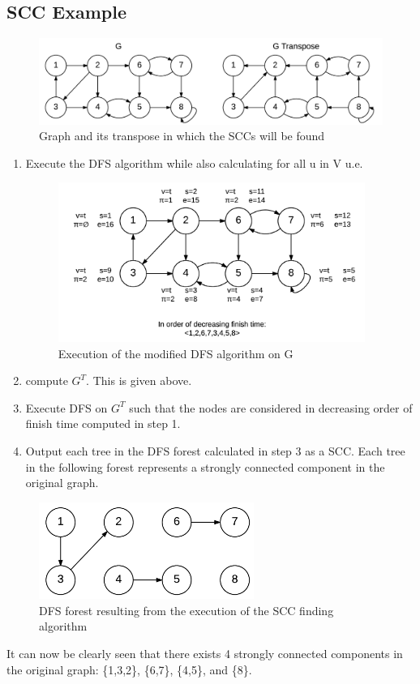 \documentclass[12pt,letterpaper]{article}
\begin{document}
\subsection{SCC Example}
\begin{figure}[h]
\centering
\includegraphics[width=13cm]{scccomplete}
\caption{Graph and its transpose in which the SCCs will be found}
\end{figure}
\begin{enumerate}
\item Execute the DFS algorithm while also calculating for all u in V u.e.
\begin{figure}[h]
\centering
\includegraphics[width=10cm]{scccomplete1}
\caption{Execution of the modified DFS algorithm on G}
\end{figure}
\FloatBarrier
\item compute $G^T$. This is given above.
\item Execute DFS on $G^T$ such that the nodes are considered in decreasing order of finish time computed in step 1.
\item Output each tree in the DFS forest calculated in step 3 as a SCC. Each tree in the following forest represents a strongly connected component in the original graph.
\end{enumerate}
\begin{figure}[h]
\centering
\includegraphics[width=7cm]{scccomplete2}
\caption{DFS forest resulting from the execution of the SCC finding algorithm}
\end{figure}
It can now be clearly seen that there exists 4 strongly connected components in the original graph: \{1,3,2\}, \{6,7\}, \{4,5\}, and \{8\}.
\end{document}
